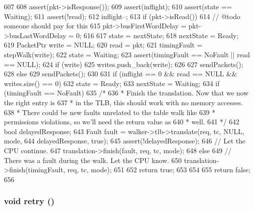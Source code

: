 \begin{DoxyCode}
607 {
608     assert(pkt->isResponse());
609     assert(inflight);
610     assert(state == Waiting);
611     assert(!read);
612     inflight--;
613     if (pkt->isRead()) {
614         // @todo someone should pay for this
615         pkt->busFirstWordDelay = pkt->busLastWordDelay = 0;
616 
617         state = nextState;
618         nextState = Ready;
619         PacketPtr write = NULL;
620         read = pkt;
621         timingFault = stepWalk(write);
622         state = Waiting;
623         assert(timingFault == NoFault || read == NULL);
624         if (write) {
625             writes.push_back(write);
626         }
627         sendPackets();
628     } else {
629         sendPackets();
630     }
631     if (inflight == 0 && read == NULL && writes.size() == 0) {
632         state = Ready;
633         nextState = Waiting;
634         if (timingFault == NoFault) {
635             /*
636              * Finish the translation. Now that we now the right entry is
637              * in the TLB, this should work with no memory accesses.
638              * There could be new faults unrelated to the table walk like
639              * permissions violations, so we'll need the return value as
640              * well.
641              */
642             bool delayedResponse;
643             Fault fault = walker->tlb->translate(req, tc, NULL, mode,
644                                                  delayedResponse, true);
645             assert(!delayedResponse);
646             // Let the CPU continue.
647             translation->finish(fault, req, tc, mode);
648         } else {
649             // There was a fault during the walk. Let the CPU know.
650             translation->finish(timingFault, req, tc, mode);
651         }
652         return true;
653     }
654 
655     return false;
656 }
\end{DoxyCode}
\hypertarget{classX86ISA_1_1Walker_1_1WalkerState_a549fc33ae3e5c345795b8384a91fb544}{
\subsubsection[{retry}]{\setlength{\rightskip}{0pt plus 5cm}void retry ()}}
\label{classX86ISA_1_1Walker_1_1WalkerState_a549fc33ae3e5c345795b8384a91fb544}



